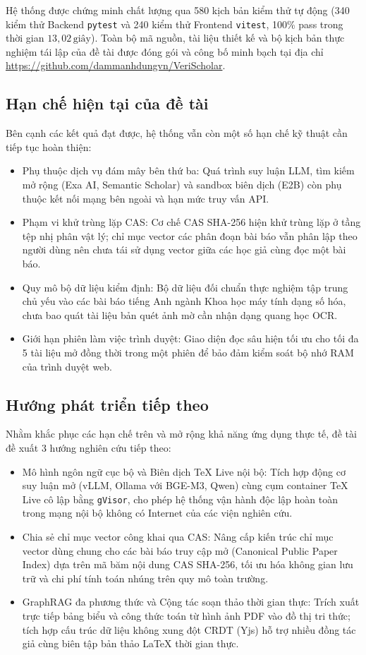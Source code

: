 Hệ thống được chứng minh chất lượng qua 580 kịch bản kiểm thử tự động (340 kiểm thử Backend \texttt{pytest} và 240 kiểm thử Frontend \texttt{vitest}, 100\% pass trong thời gian $13{,}02\,\text{giây}$). Toàn bộ mã nguồn, tài liệu thiết kế và bộ kịch bản thực nghiệm tái lập của đề tài được đóng gói và công bố minh bạch tại địa chỉ \url{https://github.com/dammanhdungvn/VeriScholar}.

\subsection*{Hạn chế hiện tại của đề tài}
Bên cạnh các kết quả đạt được, hệ thống \VS vẫn còn một số hạn chế kỹ thuật cần tiếp tục hoàn thiện:
\begin{itemize}
    \item Phụ thuộc dịch vụ đám mây bên thứ ba: Quá trình suy luận LLM, tìm kiếm mở rộng (Exa AI, Semantic Scholar) và sandbox biên dịch (E2B) còn phụ thuộc kết nối mạng bên ngoài và hạn mức truy vấn API.
    \item Phạm vi khử trùng lặp CAS: Cơ chế CAS SHA-256 hiện khử trùng lặp ở tầng tệp nhị phân vật lý; chỉ mục vector các phân đoạn bài báo vẫn phân lập theo người dùng nên chưa tái sử dụng vector giữa các học giả cùng đọc một bài báo.
    \item Quy mô bộ dữ liệu kiểm định: Bộ dữ liệu đối chuẩn thực nghiệm tập trung chủ yếu vào các bài báo tiếng Anh ngành Khoa học máy tính dạng số hóa, chưa bao quát tài liệu bản quét ảnh mờ cần nhận dạng quang học OCR.
    \item Giới hạn phiên làm việc trình duyệt: Giao diện đọc sâu hiện tối ưu cho tối đa 5 tài liệu mở đồng thời trong một phiên để bảo đảm kiểm soát bộ nhớ RAM của trình duyệt web.
\end{itemize}

\subsection*{Hướng phát triển tiếp theo}
Nhằm khắc phục các hạn chế trên và mở rộng khả năng ứng dụng thực tế, đề tài đề xuất 3 hướng nghiên cứu tiếp theo:
\begin{itemize}
    \item Mô hình ngôn ngữ cục bộ và Biên dịch TeX Live nội bộ: Tích hợp động cơ suy luận mở (vLLM, Ollama với BGE-M3, Qwen) cùng cụm container TeX Live cô lập bằng \texttt{gVisor}, cho phép hệ thống vận hành độc lập hoàn toàn trong mạng nội bộ không có Internet của các viện nghiên cứu.
    \item Chia sẻ chỉ mục vector công khai qua CAS: Nâng cấp kiến trúc chỉ mục vector dùng chung cho các bài báo truy cập mở (Canonical Public Paper Index) dựa trên mã băm nội dung CAS SHA-256, tối ưu hóa không gian lưu trữ và chi phí tính toán nhúng trên quy mô toàn trường.
    \item GraphRAG đa phương thức và Cộng tác soạn thảo thời gian thực: Trích xuất trực tiếp bảng biểu và công thức toán từ hình ảnh PDF vào đồ thị tri thức; tích hợp cấu trúc dữ liệu không xung đột CRDT (Yjs) hỗ trợ nhiều đồng tác giả cùng biên tập bản thảo LaTeX thời gian thực.
\end{itemize}
